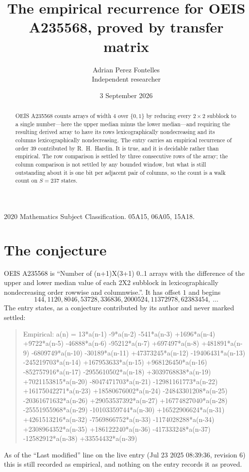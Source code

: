 \documentclass[11pt,a4paper]{article}
\title{The empirical recurrence for OEIS A235568, proved by transfer matrix}
\author{Adrian Perez Fontelles\\ \small Independent researcher}
\date{3 September 2026}
\theoremstyle{plain}
\theoremstyle{definition}
\begin{document}
\maketitle

\begin{abstract}
OEIS A235568 counts arrays of width $4$ over $\{0,1\}$ by reducing every $2\times2$ subblock to a
single number---here the upper median minus the lower median---and requiring the resulting derived array to have its rows
lexicographically nondecreasing and its columns lexicographically nondecreasing. The entry carries an
empirical recurrence of order $39$ contributed by R.~H.~Hardin. It is true, and it is
decidable rather than empirical. The row comparison is settled by three consecutive rows of the
array; the column comparison is not settled by any bounded window, but what is still outstanding
about it is one bit per adjacent pair of columns, so the count is a walk count on $S=237$
states.
\end{abstract}

\noindent\small 2020 Mathematics Subject Classification. 05A15, 06A05, 15A18.\normalsize

\section{The conjecture}

OEIS A235568 is ``Number of (n+1)X(3+1) 0..1 arrays with the difference of the upper and lower median value of each 2X2 subblock in lexicographically nondecreasing order rowwise and columnwise.''. It has offset $1$ and begins
\[
144, 1120, 8046, 53728, 336836, 2000524, 11372978, 62383454,\ \dots
\]
The entry states, as a conjecture contributed by its author and never marked settled:
\begin{quote}
Empirical: a(n) = 13*a(n-1) -9*a(n-2) -541*a(n-3) +1696*a(n-4) +9722*a(n-5) -46888*a(n-6) -95212*a(n-7) +697497*a(n-8) +481891*a(n-9) -6809749*a(n-10) -30189*a(n-11) +47373245*a(n-12) -19406431*a(n-13) -245219703*a(n-14) +167953633*a(n-15) +968126450*a(n-16) -852757916*a(n-17) -2955610502*a(n-18) +3039768838*a(n-19) +7021153815*a(n-20) -8047471703*a(n-21) -12981161773*a(n-22) +16175042271*a(n-23) +18580676002*a(n-24) -24843301208*a(n-25) -20361671632*a(n-26) +29053537392*a(n-27) +16774827040*a(n-28) -25551955968*a(n-29) -10103359744*a(n-30) +16522906624*a(n-31) +4261513216*a(n-32) -7569866752*a(n-33) -1174028288*a(n-34) +2308964352*a(n-35) +186122240*a(n-36) -417333248*a(n-37) -12582912*a(n-38) +33554432*a(n-39)
\end{quote}
As of the ``Last modified'' line on the live entry (Jul 23 2025 08:39:36, revision 6) this is still
recorded as empirical, and nothing on the entry records it as proved.
\end{document}
